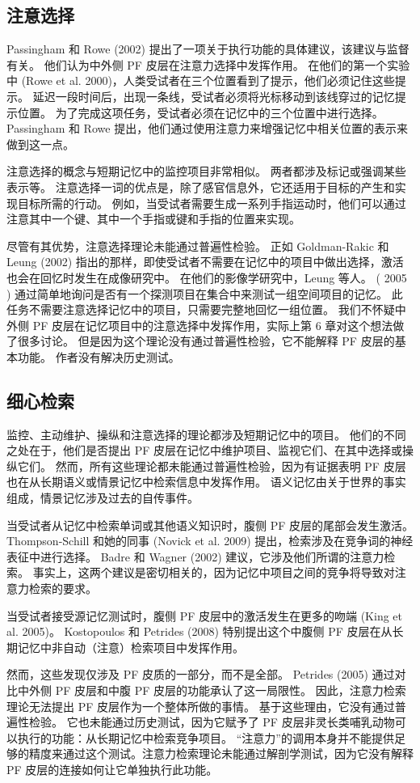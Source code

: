 \subsection{注意选择}
Passingham 和 Rowe (2002) 提出了一项关于执行功能的具体建议，该建议与监督有关。 他们认为中外侧 PF 皮层在注意力选择中发挥作用。 在他们的第一个实验中 (Rowe et al. 2000)，人类受试者在三个位置看到了提示，他们必须记住这些提示。 延迟一段时间后，出现一条线，受试者必须将光标移动到该线穿过的记忆提示位置。 为了完成这项任务，受试者必须在记忆中的三个位置中进行选择。 Passingham 和 Rowe 提出，他们通过使用注意力来增强记忆中相关位置的表示来做到这一点。
\par 
注意选择的概念与短期记忆中的监控项目非常相似。 两者都涉及标记或强调某些表示等。 注意选择一词的优点是，除了感官信息外，它还适用于目标的产生和实现目标所需的行动。 例如，当受试者需要生成一系列手指运动时，他们可以通过注意其中一个键、其中一个手指或键和手指的位置来实现。
\par 
尽管有其优势，注意选择理论未能通过普遍性检验。 正如 Goldman-Rakic 和 Leung (2002) 指出的那样，即使受试者不需要在记忆中的项目中做出选择，激活也会在回忆时发生在成像研究中。 在他们的影像学研究中，Leung 等人。 ( 2005 ) 通过简单地询问是否有一个探测项目在集合中来测试一组空间项目的记忆。 此任务不需要注意选择记忆中的项目，只需要完整地回忆一组位置。 我们不怀疑中外侧 PF 皮层在记忆项目中的注意选择中发挥作用，实际上第 6 章对这个想法做了很多讨论。 但是因为这个理论没有通过普遍性检验，它不能解释 PF 皮层的基本功能。 作者没有解决历史测试。
\subsection{细心检索}
监控、主动维护、操纵和注意选择的理论都涉及短期记忆中的项目。 他们的不同之处在于，他们是否提出 PF 皮层在记忆中维护项目、监视它们、在其中选择或操纵它们。 然而，所有这些理论都未能通过普遍性检验，因为有证据表明 PF 皮层也在从长期语义或情景记忆中检索信息中发挥作用。 语义记忆由关于世界的事实组成，情景记忆涉及过去的自传事件。
\par 
当受试者从记忆中检索单词或其他语义知识时，腹侧 PF 皮层的尾部会发生激活。 Thompson-Schill 和她的同事 (Novick et al. 2009) 提出，检索涉及在竞争词的神经表征中进行选择。 Badre 和 Wagner (2002) 建议，它涉及他们所谓的注意力检索。 事实上，这两个建议是密切相关的，因为记忆中项目之间的竞争将导致对注意力检索的要求。
\par 
当受试者接受源记忆测试时，腹侧 PF 皮层中的激活发生在更多的吻端 (King et al. 2005)。 Kostopoulos 和 Petrides (2008) 特别提出这个中腹侧 PF 皮层在从长期记忆中非自动（注意）检索项目中发挥作用。
\par 
然而，这些发现仅涉及 PF 皮质的一部分，而不是全部。 Petrides (2005) 通过对比中外侧 PF 皮层和中腹 PF 皮层的功能承认了这一局限性。 因此，注意力检索理论无法提出 PF 皮层作为一个整体所做的事情。 基于这些理由，它没有通过普遍性检验。 它也未能通过历史测试，因为它赋予了 PF 皮层非灵长类哺乳动物可以执行的功能：从长期记忆中检索竞争项目。 “注意力”的调用本身并不能提供足够的精度来通过这个测试。注意力检索理论未能通过解剖学测试，因为它没有解释 PF 皮层的连接如何让它单独执行此功能。
